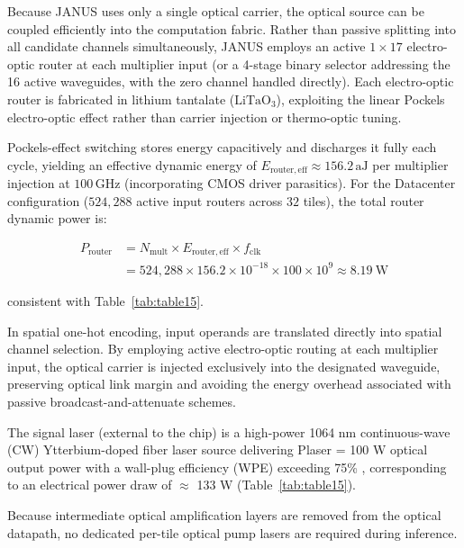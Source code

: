 \documentclass[journal]{IEEEtran}
\begin{document}
Because JANUS uses only a single optical carrier, the optical source can be coupled efficiently into the computation fabric. Rather than passive splitting into all candidate channels simultaneously, JANUS employs an active $1 \times 17$ electro-optic router at each multiplier input (or a 4-stage binary selector addressing the 16 active waveguides, with the zero channel handled directly). Each electro-optic router is fabricated in lithium tantalate ($\mathrm{LiTaO_3}$), exploiting the linear Pockels electro-optic effect rather than carrier injection or thermo-optic tuning. 

Pockels-effect switching stores energy capacitively and discharges it fully each cycle, yielding an effective dynamic energy of $E_{\mathrm{router,eff}} \approx 156.2\,\mathrm{aJ}$ per multiplier injection at $100\,\mathrm{GHz}$ (incorporating CMOS driver parasitics). For the Datacenter configuration ($524{,}288$ active input routers across $32$ tiles), the total router dynamic power is:

\begin{equation}
\begin{aligned}
P_{\mathrm{router}} &= N_{\mathrm{mult}} \times E_{\mathrm{router,eff}} \times f_{\mathrm{clk}} \\
&= 524{,}288 \times 156.2 \times 10^{-18} \times 100 \times 10^{9} \approx 8.19~\mathrm{W}
\end{aligned}
\end{equation}

consistent with Table~\ref{tab:table15}.

In spatial one-hot encoding, input operands are translated directly into spatial channel selection. By employing active electro-optic routing at each multiplier input, the optical carrier is injected exclusively into the designated waveguide, preserving optical link margin and avoiding the energy overhead associated with passive broadcast-and-attenuate schemes.

The signal laser (external to the chip) is a high-power 1064 nm continuous-wave (CW) Ytterbium-doped fiber laser source delivering Plaser = 100 W optical output power with a wall-plug efficiency (WPE) exceeding 75\% \cite{Jeong2004}, corresponding to an electrical power draw of $\approx$ 133 W (Table~\ref{tab:table15}). 

Because intermediate optical amplification layers are removed from the optical datapath, no dedicated per-tile optical pump lasers are required during inference.
\end{document}
